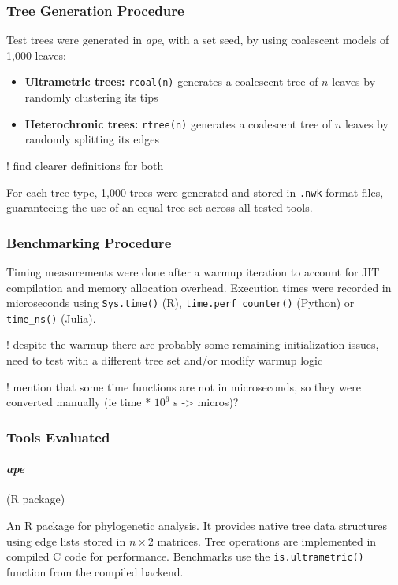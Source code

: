 \documentclass[11pt, a4paper]{article}
\newcommand{\ape}{\textit{ape}}
\begin{document}
\subsubsection{Tree Generation Procedure}

Test trees were generated in \ape, with a set seed, by using coalescent models of 1{,}000 leaves:
\begin{itemize}
    \item \textbf{Ultrametric trees:} \texttt{rcoal(n)} generates a coalescent tree of $n$ leaves by randomly clustering its tips
    \item \textbf{Heterochronic trees:} \texttt{rtree(n)} generates a coalescent tree of $n$ leaves by randomly splitting its edges
\end{itemize}

! find clearer definitions for both

For each tree type, 1{,}000 trees were generated and stored in \texttt{.nwk} format files, guaranteeing the use of an equal tree set across all tested tools. 

\subsubsection{Benchmarking Procedure}

Timing measurements were done after a warmup iteration to account for JIT compilation and memory allocation overhead. Execution times were recorded in microseconds using
\texttt{Sys.time()} (R), \texttt{time.perf\_counter()} (Python) or \texttt{time\_ns()} (Julia).

! despite the warmup there are probably some remaining initialization issues, need to test with a different tree set and/or modify warmup logic

! mention that some time functions are not in microseconds, so they were converted manually (ie time * $10^6$ s -> micros)?

\subsubsection{Tools Evaluated}

\paragraph{\ape} (R package)

An R package for phylogenetic analysis. It provides native tree data structures using edge lists stored in $n \times 2$ matrices. Tree operations are implemented in compiled C code for performance. Benchmarks use the \texttt{is.ultrametric()} function from the compiled backend.
\end{document}
